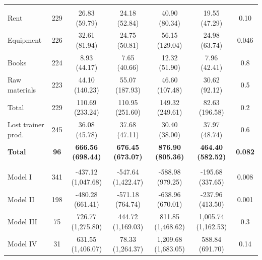 \documentclass[
  a4paper, twoside, 12pt]{book}
\begin{document}
\begin{table}[H]
{\begin{threeparttable}
\begin{tabular}[t]{lcccccc}
\addlinespace[0.3em]
\multicolumn{7}{l}{\hspace{1em} Training costs}\\
\hspace{1em}\hspace{1em}Rent & 229 & 26.83 (59.79) & 24.18 (52.84) & 40.90 (80.34) & 19.55 (47.29) & 0.10\\
\hspace{1em}\hspace{1em}Equipment & 226 & 32.61 (81.94) & 24.75 (50.81) & 56.15 (129.04) & 24.98 (63.74) & 0.046\\
\hspace{1em}\hspace{1em}Books & 224 & 8.93 (44.17) & 7.65 (40.66) & 12.32 (51.90) & 7.96 (42.41) & 0.8\\
\hspace{1em}\hspace{1em}Raw materials & 223 & 44.10 (140.23) & 55.07 (187.93) & 46.60 (107.48) & 30.62 (92.12) & 0.5\\
\hspace{1em}\hspace{1em}Total & 229 & 110.69 (233.24) & 110.95 (251.60) & 149.32 (249.61) & 82.63 (196.58) & 0.2\\
\hspace{1em}Lost trainer prod. & 245 & 36.08 (45.78) & 37.68 (47.11) & 30.40 (38.00) & 37.97 (48.74) & 0.6\\
\textbf{\hspace{1em}Total} & \textbf{96} & \textbf{666.56 (698.44)} & \textbf{676.45 (673.07)} & \textbf{876.90 (805.36)} & \textbf{464.40 (582.52)} & \textbf{0.082}\\
\addlinespace[0.3em]
\hline
\multicolumn{7}{l}{\textbf{Net Benefits}}\\
\hspace{1em}Model I & 341 & -437.12 (1,047.68) & -547.64 (1,422.47) & -588.98 (979.25) & -195.68 (337.65) & 0.008\\
\hspace{1em}Model II & 198 & -480.28 (661.41) & -571.18 (764.74) & -638.96 (670.01) & -237.96 (413.50) & 0.001\\
\hspace{1em}Model III & 75 & 726.77 (1,275.80) & 444.72 (1,169.03) & 811.85 (1,468.62) & 1,005.74 (1,162.53) & 0.3\\
\hspace{1em}Model IV & 31 & 631.55 (1,406.07) & 78.33 (1,264.37) & 1,209.68 (1,683.05) & 588.84 (691.70) & 0.14\\

\end{tabular}
\end{threeparttable}}
\end{table}
\end{document}
